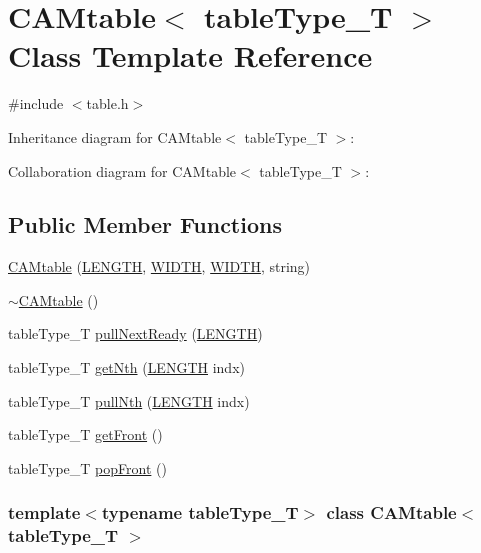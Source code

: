\hypertarget{classCAMtable}{
\section{CAMtable$<$ tableType\_\-T $>$ Class Template Reference}
\label{classCAMtable}
}


{\ttfamily \#include $<$table.h$>$}



Inheritance diagram for CAMtable$<$ tableType\_\-T $>$:


Collaboration diagram for CAMtable$<$ tableType\_\-T $>$:
\subsection*{Public Member Functions}
\begin{DoxyCompactItemize}
\item 
\hyperlink{classCAMtable_a45eb83cb39ff8272d50612a1f5f6f85b}{CAMtable} (\hyperlink{global_2global_8h_ad7ec63c69447a2b630929c8e0197860d}{LENGTH}, \hyperlink{global_2global_8h_a6fa2e24b8a418fa215e183264cbea3aa}{WIDTH}, \hyperlink{global_2global_8h_a6fa2e24b8a418fa215e183264cbea3aa}{WIDTH}, string)
\item 
\hyperlink{classCAMtable_a5d8003f0fb86c270c65674efa53b1172}{$\sim$CAMtable} ()
\item 
tableType\_\-T \hyperlink{classCAMtable_a07cd94cd88b502e5b0e2699b8762f560}{pullNextReady} (\hyperlink{global_2global_8h_ad7ec63c69447a2b630929c8e0197860d}{LENGTH})
\item 
tableType\_\-T \hyperlink{classCAMtable_abef54f1e30ed42845d48c98917de32e1}{getNth} (\hyperlink{global_2global_8h_ad7ec63c69447a2b630929c8e0197860d}{LENGTH} indx)
\item 
tableType\_\-T \hyperlink{classCAMtable_a9644548c43e912d1cd1d0431fc5179e9}{pullNth} (\hyperlink{global_2global_8h_ad7ec63c69447a2b630929c8e0197860d}{LENGTH} indx)
\item 
tableType\_\-T \hyperlink{classCAMtable_a1111b552094db836302ac5ce0671794a}{getFront} ()
\item 
tableType\_\-T \hyperlink{classCAMtable_a5e19b284c54893d488fb7eae5f84aa13}{popFront} ()
\end{DoxyCompactItemize}
\subsubsection*{template$<$typename tableType\_\-T$>$ class CAMtable$<$ tableType\_\-T $>$}



